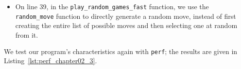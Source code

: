 \documentclass[12pt,a4paper,twoside,openright]{book}
\begin{document}
\begin{itemize}
\item On line 39, in the \texttt{play_random_games_fast} function, we use the \texttt{random_move} function to directly generate a random move, instead of first creating the entire list of possible moves and then selecting one at random from it.

\end{itemize}


We test our program's characteristics again with \texttt{perf}; the results are given in Listing~\ref{lst:perf_chapter02_3}.
\end{document}

